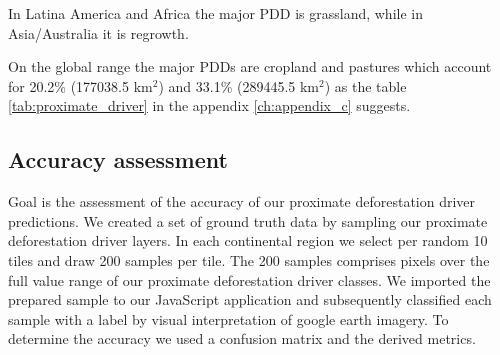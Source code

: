			In Latina America and Africa the major \ac{PDD} is grassland, while in Asia/Australia it is regrowth. 

			On the global range the major \acp{PDD} are cropland and pastures which account for 20.2\% (177038.5 km$^2$) and 33.1\% (289445.5 km$^2$) as the table \ref{tab:proximate_driver} in the appendix \ref{ch:appendix_c} suggests. 

		\subsection{Accuracy assessment}
		\label{subsec:results_accuracy_assessment}
			 Goal is the assessment of the accuracy of our proximate deforestation driver predictions. We created a set of ground truth data by sampling our proximate deforestation driver layers. In each continental region we select per random 10 tiles and draw 200 samples per tile. The 200 samples comprises pixels over the full value range of our proximate deforestation driver classes. We imported the prepared sample to our JavaScript application and subsequently classified each sample with a label by visual interpretation of google earth imagery. To determine the accuracy we used a confusion matrix and the derived metrics.

